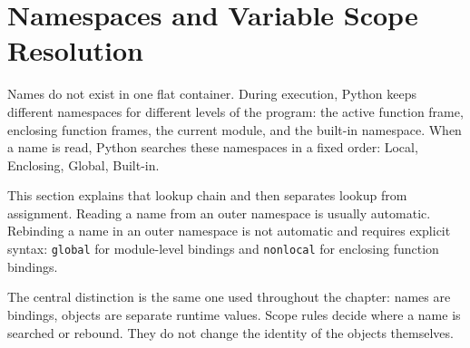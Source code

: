\section{Namespaces and Variable Scope Resolution}

Names do not exist in one flat container. During execution, Python keeps different namespaces for different levels of the program: the active function frame, enclosing function frames, the current module, and the built-in namespace. When a name is read, Python searches these namespaces in a fixed order: Local, Enclosing, Global, Built-in.

This section explains that lookup chain and then separates lookup from assignment. Reading a name from an outer namespace is usually automatic. Rebinding a name in an outer namespace is not automatic and requires explicit syntax: \texttt{global} for module-level bindings and \texttt{nonlocal} for enclosing function bindings.

The central distinction is the same one used throughout the chapter: names are bindings, objects are separate runtime values. Scope rules decide where a name is searched or rebound. They do not change the identity of the objects themselves.